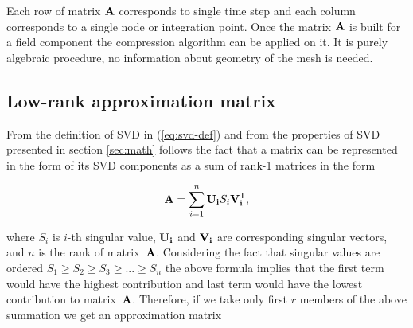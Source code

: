 Each row of matrix $\mathbf{A}$ corresponds to single time step and each column corresponds to a single node or integration point. Once the matrix $\mathbf{A}$ is built for a field component the compression algorithm can be applied on it. It is purely algebraic procedure, no information about geometry of the mesh is needed. 


\subsection{Low-rank approximation matrix}

From the definition of SVD in (\ref{eq:svd-def}) and from the properties of SVD presented in section \ref{sec:math} follows the fact that a matrix can be represented in the form of its SVD components as a sum of rank-1 matrices in the form


\begin{equation}
\mathbf{A}=\sum_{i=1}^{n} \mathbf{U_{i}}S_{i}\mathbf{V_{i}^{\mathsf{T}}},
\label{eq:svd-expansion}
\end{equation}

\noindent
where $S_{i}$ is $i$-th singular value, $\mathbf{U_{i}}$ and $\mathbf{V_{i}}$ are corresponding singular vectors, and $n$ is the rank of matrix~$\mathbf{A}$. Considering the fact that singular values are ordered $S_{1} \geq S_{2} \geq S_{3} \geq ... \geq S_{n}$ the above formula implies that the first term would have the highest contribution and last term would have the lowest contribution to matrix~$\mathbf{A}$. Therefore, if we take only first $r$ members of the above summation we get an approximation matrix


